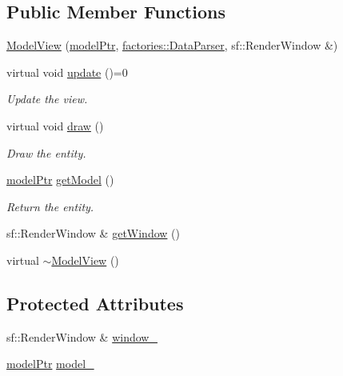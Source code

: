 \subsection*{\-Public \-Member \-Functions}
\begin{DoxyCompactItemize}
\item 
\hyperlink{classviews_1_1ModelView_a63badfe4ff02d30a8a239db7195e70b7}{\-Model\-View} (\hyperlink{ModelView_8h_a78966ddb517fca8d2b29a2bc5c31e74e}{model\-Ptr}, \hyperlink{classfactories_1_1DataParser}{factories\-::\-Data\-Parser}, sf\-::\-Render\-Window \&)
\item 
virtual void \hyperlink{classviews_1_1ModelView_a230b5304a78ff899254ab90b288f620c}{update} ()=0
\begin{DoxyCompactList}\small\item\em \-Update the view. \end{DoxyCompactList}\item 
virtual void \hyperlink{classviews_1_1ModelView_a3e17923ec58fe6950a6e114cef22ad9b}{draw} ()
\begin{DoxyCompactList}\small\item\em \-Draw the entity. \end{DoxyCompactList}\item 
\hyperlink{ModelView_8h_a78966ddb517fca8d2b29a2bc5c31e74e}{model\-Ptr} \hyperlink{classviews_1_1ModelView_a8e4d979de3da9eaf4d61fe57344c79a3}{get\-Model} ()
\begin{DoxyCompactList}\small\item\em \-Return the entity. \end{DoxyCompactList}\item 
sf\-::\-Render\-Window \& \hyperlink{classviews_1_1ModelView_ac7b58de4bd47cafb47b95602082de7b7}{get\-Window} ()
\item 
virtual \hyperlink{classviews_1_1ModelView_adfe42d0e9b2091574f9e1a2debd3c36b}{$\sim$\-Model\-View} ()
\end{DoxyCompactItemize}
\subsection*{\-Protected \-Attributes}
\begin{DoxyCompactItemize}
\item 
sf\-::\-Render\-Window \& \hyperlink{classviews_1_1ModelView_afa1e9f130689ee9055c95183a7f65944}{window\-\_\-}
\item 
\hyperlink{ModelView_8h_a78966ddb517fca8d2b29a2bc5c31e74e}{model\-Ptr} \hyperlink{classviews_1_1ModelView_aa54071fac8ab8c182e8f2c5ff7622284}{model\-\_\-}
\end{DoxyCompactItemize}



